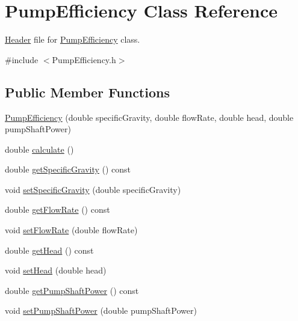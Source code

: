\hypertarget{class_pump_efficiency}{}\section{Pump\+Efficiency Class Reference}
\label{class_pump_efficiency}


\hyperlink{class_header}{Header} file for \hyperlink{class_pump_efficiency}{Pump\+Efficiency} class.  




{\ttfamily \#include $<$Pump\+Efficiency.\+h$>$}

\subsection*{Public Member Functions}
\begin{DoxyCompactItemize}
\item 
\hyperlink{class_pump_efficiency_abe1f431db681c3a512a7f9f11ff182cb}{Pump\+Efficiency} (double specific\+Gravity, double flow\+Rate, double head, double pump\+Shaft\+Power)
\item 
double \hyperlink{class_pump_efficiency_ab45de46019ff182d4f11810b2791a8c9}{calculate} ()
\item 
double \hyperlink{class_pump_efficiency_a6eeeabb70d99a79a636f35ca74d8ec05}{get\+Specific\+Gravity} () const
\item 
void \hyperlink{class_pump_efficiency_afc8b3ecd0fe1a356c82042aa0fc84024}{set\+Specific\+Gravity} (double specific\+Gravity)
\item 
double \hyperlink{class_pump_efficiency_a715c4ade497e99640f09546fad6479bc}{get\+Flow\+Rate} () const
\item 
void \hyperlink{class_pump_efficiency_aad051c44f6bdbc6108f2c40450c9d510}{set\+Flow\+Rate} (double flow\+Rate)
\item 
double \hyperlink{class_pump_efficiency_aa89f7727e67b3e0d20149eee66d10f69}{get\+Head} () const
\item 
void \hyperlink{class_pump_efficiency_addfa92d7c30598ecedcee8f7c47eed29}{set\+Head} (double head)
\item 
double \hyperlink{class_pump_efficiency_aeb6d4f2cce565fbe834d71c7a52b87d1}{get\+Pump\+Shaft\+Power} () const
\item 
void \hyperlink{class_pump_efficiency_ad3c2e64a590528b54e3878f9d1f3223a}{set\+Pump\+Shaft\+Power} (double pump\+Shaft\+Power)
\end{DoxyCompactItemize}


